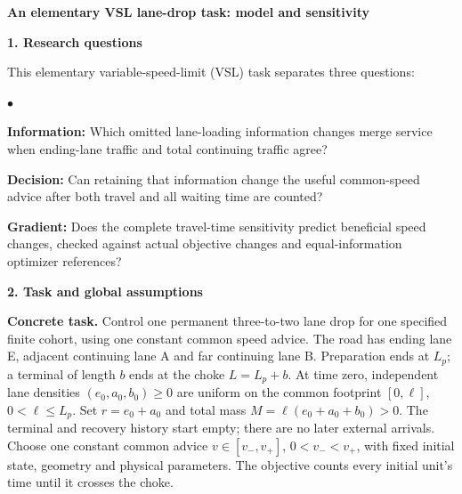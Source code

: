 \documentclass[10pt,a4paper]{article}
\newcommand{\head}[1]{\par\vspace{4pt}\noindent\textbf{#1}\par\nobreak\vspace{1pt}}
\newenvironment{points}{\begin{list}{$\bullet$}{%
 \setlength{\leftmargin}{1.4em}\setlength{\labelwidth}{0.7em}%
 \setlength{\labelsep}{0.4em}\setlength{\itemsep}{2pt}%
 \setlength{\parsep}{0pt}\setlength{\topsep}{3pt}}}{\end{list}}
\begin{document}
\begin{center}
{\large\bfseries An elementary VSL lane-drop task: model and sensitivity}
\end{center}
\vspace{-5pt}

\head{1. Research questions}
This elementary variable-speed-limit (VSL) task separates three questions:
\begin{points}
\item \textbf{Information:} Which omitted lane-loading information changes
merge service when ending-lane traffic and total continuing traffic agree?
\item \textbf{Decision:} Can retaining that information change the useful
common-speed advice after both travel and all waiting time are counted?
\item \textbf{Gradient:} Does the complete travel-time sensitivity predict
beneficial speed changes, checked against actual objective changes and
equal-information optimizer references?
\end{points}

\head{2. Task and global assumptions}
\textbf{Concrete task.} Control one permanent three-to-two lane drop
for one specified finite cohort, using one constant common speed advice.
The road has ending lane E, adjacent continuing lane A
and far continuing lane B. Preparation ends at $L_p$; a terminal of length
$b$ ends at the choke $L=L_p+b$. At time zero, independent lane densities
$(e_0,a_0,b_0)\geq0$ are uniform on the common footprint $[0,\ell]$,
$0<\ell\leq L_p$. Set $r=e_0+a_0$ and total mass
$M=\ell(e_0+a_0+b_0)>0$. The terminal and recovery history start empty;
there are no later external arrivals. Choose one constant common advice
$v\in[v_-,v_+]$, $0<v_-<v_+$, with fixed initial state, geometry and physical parameters.
The objective counts every initial unit's time until it crosses the choke.
\end{document}
